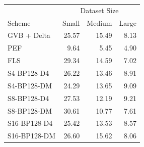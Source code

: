 \begin{tabular}{lrrr}
\toprule
 & \multicolumn{3}{c}{Dataset Size} \\
Scheme & Small & Medium & Large \\
\midrule
GVB + Delta & 25.57 & 15.49 & 8.13 \\
PEF & 9.64 & 5.45 & 4.90 \\
FLS & 29.34 & 14.59 & 7.02 \\
S4-BP128-D4 & 26.22 & 13.46 & 8.91 \\
S4-BP128-DM & 24.29 & 13.65 & 9.09 \\
S8-BP128-D4 & 27.53 & 12.19 & 9.21 \\
S8-BP128-DM & 30.61 & 10.77 & 7.61 \\
S16-BP128-D4 & 25.42 & 13.53 & 8.57 \\
S16-BP128-DM & 26.60 & 15.62 & 8.06 \\
\bottomrule
\end{tabular}
